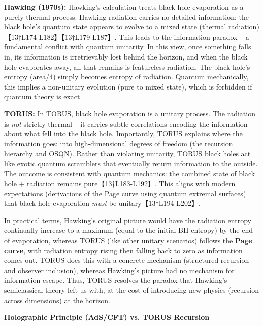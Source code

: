 \documentclass[]{article}
\begin{document}
\textbf{Hawking (1970s):} Hawking's calculation treats black hole
evaporation as a purely thermal process. Hawking radiation carries no
detailed information; the black hole's quantum state appears to evolve
to a mixed state (thermal radiation)【13†L174-L182】【13†L179-L187】.
This leads to the information paradox -- a fundamental conflict with
quantum unitarity. In this view, once something falls in, its
information is irretrievably lost behind the horizon, and when the black
hole evaporates away, all that remains is featureless radiation. The
black hole's entropy (area/4) simply becomes entropy of radiation.
Quantum mechanically, this implies a non-unitary evolution (pure to
mixed state), which is forbidden if quantum theory is exact.

\textbf{TORUS:} In TORUS, black hole evaporation is a unitary process.
The radiation is \emph{not} strictly thermal -- it carries subtle
correlations encoding the information about what fell into the black
hole. Importantly, TORUS explains where the information goes: into
high-dimensional degrees of freedom (the recursion hierarchy and OSQN).
Rather than violating unitarity, TORUS black holes act like exotic
quantum scramblers that eventually return information to the outside.
The outcome is consistent with quantum mechanics: the combined state of
black hole + radiation remains pure【13†L183-L192】. This aligns with
modern expectations (derivations of the Page curve using quantum
extremal surfaces) that black hole evaporation \emph{must} be
unitary【13†L194-L202】.

In practical terms, Hawking's original picture would have the radiation
entropy continually increase to a maximum (equal to the initial BH
entropy) by the end of evaporation, whereas TORUS (like other unitary
scenarios) follows the \textbf{Page curve}, with radiation entropy
rising then falling back to zero as information comes out. TORUS does
this with a concrete mechanism (structured recursion and observer
inclusion), whereas Hawking's picture had no mechanism for information
escape. Thus, TORUS resolves the paradox that Hawking's semiclassical
theory left us with, at the cost of introducing new physics (recursion
across dimensions) at the horizon.

\textbf{Holographic Principle (AdS/CFT) vs. TORUS Recursion}
\end{document}
